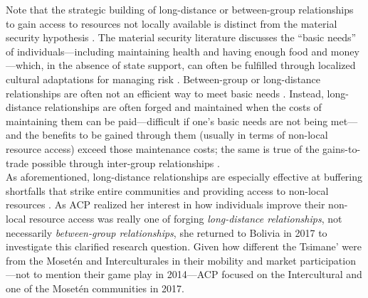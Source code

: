 \documentclass[bibauthoryear]{aa}
\begin{document}
Note that the strategic building of long-distance or between-group relationships to gain access to resources not locally available is distinct from the material security hypothesis \citep{hruschka2013economic, hruschka2014impartial}. The material security literature discusses the ``basic needs'' of individuals---including maintaining health and having enough food and money \citep{hruschka2014impartial}---which, in the absence of state support, can often be fulfilled through localized cultural adaptations for managing risk \citep{pisorjones2020}. Between-group or long-distance relationships are often not an efficient way to meet basic needs \citep{minnis1985social}. Instead, long-distance relationships are often forged and maintained when the costs of maintaining them can be paid---difficult if one's basic needs are not being met---and the benefits to be gained through them (usually in terms of non-local resource access) exceed those maintenance costs; the same is true of the gains-to-trade possible through inter-group relationships \citep{bellmoya}.\\
\indent
	As aforementioned, long-distance relationships are especially effective at buffering shortfalls that strike entire communities and providing access to non-local resources \citep{pisor2019evolution, pisorjones2020}. As ACP realized her interest in how individuals improve their non-local resource access was really one of forging \textit{long-distance relationships}, not necessarily \textit{between-group relationships}, she returned to Bolivia in 2017 to investigate this clarified research question. Given how different the Tsimane’ were from the Mosetén and Interculturales in their mobility and market participation---not to mention their game play in 2014---ACP focused on the Intercultural and one of the Moset\'en communities in 2017.
	
\end{document}
